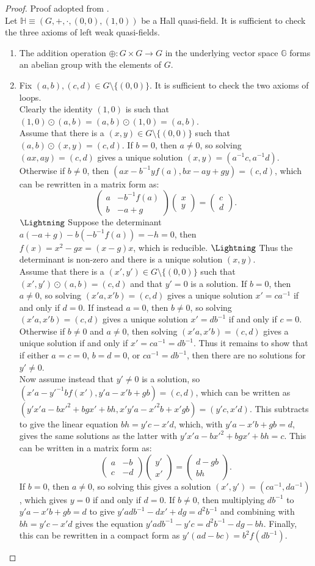 \documentclass{report}
\renewcommand{\H}{\mathbb{H}}
\newcommand{\G}{\mathbb{G}}
\newcommand{\two}[2]{\begin{pmatrix} #1 \\ #2 \end{pmatrix}}
\theoremstyle{definition}\newtheorem*{definition}{Definition}
\theoremstyle{definition}\newtheorem*{example}{Example}
\theoremstyle{remark}\newtheorem*{remark}{Remark}
\begin{document}
\begin{proof}
Proof adopted from \cite{5}. \\
Let $ \H \equiv (G, +, \cdot, (0, 0), (1, 0)) $ be a Hall quasi-field. It is sufficient to check the three axioms of left weak quasi-fields.
\begin{enumerate}
  \item The addition operation $ \oplus : G \times G \to G $ in the underlying vector space $ \G $ forms an abelian group with the elements of $ G $.
  \item Fix $ (a, b), (c, d) \in G \setminus \{ (0, 0) \} $. It is sufficient to check the two axioms of loops. \\
    Clearly the identity $ (1, 0) $ is such that $ (1, 0) \odot (a, b) = (a, b) \odot (1, 0) = (a, b) $. \\
    Assume that there is a $ (x, y) \in G \setminus \{ (0, 0) \} $ such that $ (a, b) \odot (x, y) = (c, d) $. If $ b = 0 $, then $ a \ne 0 $, so solving $ (ax, ay) = (c, d) $ gives a unique solution $ (x, y) = (a^{-1} c, a^{-1} d) $. Otherwise if $ b \ne 0 $, then $ (ax - b^{-1} y f(a), bx - ay + gy) = (c, d) $, which can be rewritten in a matrix form as: $$ \two{a & -b^{-1} f(a)}{b & -a + g} \two{x}{y} = \two{c}{d}. $$ $ \text{\Lightning} $ Suppose the determinant $ a (-a + g) - b (-b^{-1} f(a)) = -h = 0 $, then $ f(x) = x^2 - gx = (x - g) x $, which is reducible. $ \text{\Lightning} $ Thus the determinant is non-zero and there is a unique solution $ (x, y) $. \\
    Assume that there is a $ (x', y') \in G \setminus \{ (0, 0) \} $ such that $ (x', y') \odot (a, b) = (c, d) $ and that $ y' = 0 $ is a solution. If $ b = 0 $, then $ a \ne 0 $, so solving $ (x'a, x'b) = (c, d) $ gives a unique solution $ x' = ca^{-1} $ if and only if $ d = 0 $. If instead $ a = 0 $, then $ b \ne 0 $, so solving $ (x'a, x'b) = (c, d) $ gives a unique solution $ x' = db^{-1} $ if and only if $ c = 0 $. Otherwise if $ b \ne 0 $ and $ a \ne 0 $, then solving $ (x'a, x'b) = (c, d) $ gives a unique solution if and only if $ x' = ca^{-1} = db^{-1} $. Thus it remains to show that if either $ a = c = 0 $, $ b = d = 0 $, or $ ca^{-1} = db^{-1} $, then there are no solutions for $ y' \ne 0 $. \\
    Now assume instead that $ y' \ne 0 $ is a solution, so $ (x'a - y'^{-1} b f(x'), y'a - x'b + gb) = (c, d) $, which can be written as $ (y'x'a - bx'^2 + bgx' + bh, x'y'a - x'^2 b + x'gb) = (y'c, x'd) $. This subtracts to give the linear equation $ bh = y'c - x'd $, which, with $ y'a - x'b + gb = d $, gives the same solutions as the latter with $ y'x'a - bx'^2 + bgx' + bh = c $. This can be written in a matrix form as: $$ \two{a & -b}{c & -d} \two{y'}{x'} = \two{d - gb}{bh}. $$ If $ b = 0 $, then $ a \ne 0 $, so solving this gives a solution $ (x', y') = (ca^{-1}, da^{-1}) $, which gives $ y = 0 $ if and only if $ d = 0 $. If $ b \ne 0 $, then multiplying $ db^{-1} $ to $ y'a - x'b + gb = d $ to give $ y'adb^{-1} - dx' + dg = d^2 b^{-1} $ and combining with $ bh = y'c - x'd $ gives the equation $ y'adb^{-1} - y'c = d^2 b^{-1} - dg - bh $. Finally, this can be rewritten in a compact form as $ y' (ad - bc) = b^2 f(db^{-1}) $. \\ 

\end{enumerate}
\end{proof}
\end{document}
